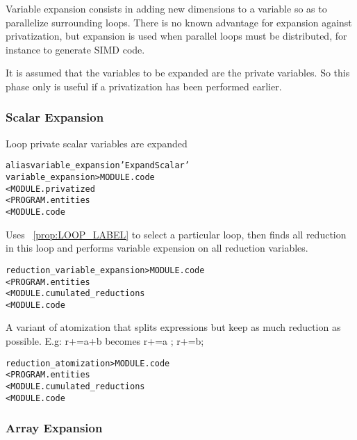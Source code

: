 \documentclass[a4paper]{report}
\newenvironment{PipsMake}{\begin{alltt}}{\end{alltt}}
\newcommand{\PipsPropRef}[1]{\texttt{\detokenize{#1}}~\ref{prop:#1}}
\newenvironment{PipsPass}[1]{\label{pass:#1}}{}
\begin{document}
Variable expansion consists in adding new dimensions to a variable so as
to parallelize surrounding loops. There is no known advantage for
expansion against privatization, but expansion is used when parallel loops
must be distributed, for instance to generate SIMD code.

It is assumed that the variables to be expanded are the private
variables. So this phase only is useful if a privatization has been
performed earlier.

\subsubsection{Scalar Expansion}

\begin{PipsPass}{variable_expansion}
Loop private scalar variables are expanded
\end{PipsPass}

\begin{PipsMake}
alias variable_expansion 'Expand Scalar'
variable_expansion                    > MODULE.code
        < MODULE.privatized
        < PROGRAM.entities
        < MODULE.code
\end{PipsMake}

\begin{PipsPass}{reduction_variable_expansion}
Uses \PipsPropRef{LOOP_LABEL} to select a particular loop,
then finds all reduction in this loop and performs variable expension on all reduction variables.
\end{PipsPass}

\begin{PipsMake}
reduction_variable_expansion      > MODULE.code
        < PROGRAM.entities
        < MODULE.cumulated_reductions
        < MODULE.code
\end{PipsMake}

\begin{PipsPass}{reduction_atomization}
  A variant of atomization that splits expressions but keep as much
  reduction as possible. E.g: r+=a+b becomes r+=a ; r+=b;
\end{PipsPass}

\begin{PipsMake}
reduction_atomization      > MODULE.code
        < PROGRAM.entities
        < MODULE.cumulated_reductions
        < MODULE.code
\end{PipsMake}

\subsubsection{Array Expansion}
\end{document}
